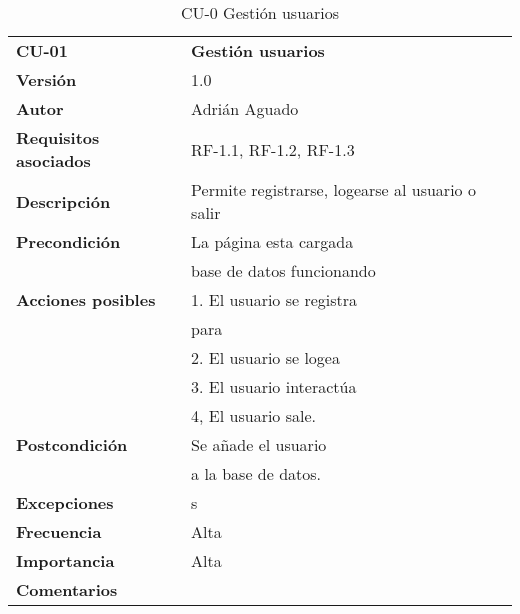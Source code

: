 \begin{table}
\begin{tabular}{llr}  
\toprule
\begin{minipage}[b]{0.24\columnwidth}\raggedright\strut
\textbf{CU-01}\strut
\end{minipage} & \begin{minipage}[b]{0.72\columnwidth}\raggedright\strut
\textbf{Gestión usuarios}\strut
\end{minipage}\tabularnewline
\cmidrule(r){1-2}
\textbf{Versión}       & 1.0           \\
\textbf{Autor}       & Adrián  Aguado    \\
\textbf{Requisitos asociados}       & RF-1.1, RF-1.2, RF-1.3 \\ 
\textbf{Descripción} & Permite registrarse, logearse al usuario o salir\\
\textbf{Precondición} & La página esta cargada \\
& base de datos funcionando       \\
\textbf{Acciones posibles} & 1. El usuario se registra \\
& para\\
& 2. El usuario  se logea \\
& 3. El usuario interactúa\\
& 4, El usuario sale.        \\
\textbf{Postcondición} & Se añade el usuario \\
& a la base de datos.     \\
\textbf{Excepciones} & s \\
\textbf{Frecuencia} & Alta            \\
\textbf{Importancia} & Alta            \\
\textbf{Comentarios } &       \\
\bottomrule
\end{tabular}
\caption{CU-0 Gestión usuarios} 
\end{table}

